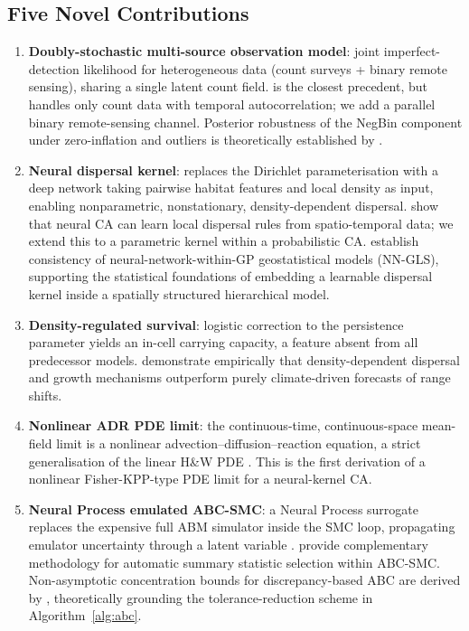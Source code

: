 \documentclass[12pt,a4paper]{article}
\theoremstyle{definition}
\begin{document}
\subsection{Five Novel Contributions}
\begin{enumerate}[leftmargin=1.5em,label=\textbf{\arabic*.}]
  \item \textbf{Doubly-stochastic multi-source observation model}: joint imperfect-detection likelihood for heterogeneous data (count surveys + binary remote sensing), sharing a single latent count field. \citet{verhoef2025} is the closest precedent, but handles only count data with temporal autocorrelation; we add a parallel binary remote-sensing channel. Posterior robustness of the NegBin component under zero-inflation and outliers is theoretically established by \citet{hamura2025}.
  \item \textbf{Neural dispersal kernel}: replaces the Dirichlet parameterisation with a deep network taking pairwise habitat features and local density as input, enabling nonparametric, nonstationary, density-dependent dispersal. \citet{richardson2024} show that neural CA can learn local dispersal rules from spatio-temporal data; we extend this to a parametric kernel within a probabilistic CA. \citet{zhan2025} establish consistency of neural-network-within-GP geostatistical models (NN-GLS), supporting the statistical foundations of embedding a learnable dispersal kernel inside a spatially structured hierarchical model.
  \item \textbf{Density-regulated survival}: logistic correction to the persistence parameter yields an in-cell carrying capacity, a feature absent from all predecessor models. \citet{pletcher2025} demonstrate empirically that density-dependent dispersal and growth mechanisms outperform purely climate-driven forecasts of range shifts.
  \item \textbf{Nonlinear ADR PDE limit}: the continuous-time, continuous-space mean-field limit is a nonlinear advection--diffusion--reaction equation, a strict generalisation of the linear H\&W PDE \citep[Eq.~14]{hooten2010}. This is the first derivation of a nonlinear Fisher-KPP-type PDE limit for a neural-kernel CA.
  \item \textbf{Neural Process emulated ABC-SMC}: a Neural Process surrogate \citep{garnelo2018} replaces the expensive full ABM simulator inside the SMC loop, propagating emulator uncertainty through a latent variable \citep{scheurer2025,hikida2025}. \citet{dinh2025} provide complementary methodology for automatic summary statistic selection within ABC-SMC. Non-asymptotic concentration bounds for discrepancy-based ABC are derived by \citet{legramanti2025}, theoretically grounding the tolerance-reduction scheme in Algorithm~\ref{alg:abc}.
\end{enumerate}
\end{document}
